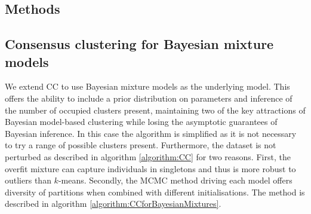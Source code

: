 \documentclass{bioinfo}
\begin{document}
\begin{methods}
\section{Methods}

\subsection{Consensus clustering for Bayesian mixture models}
We extend CC to use Bayesian mixture models as the underlying model. This offers the ability to include a prior distribution on parameters and inference of the number of occupied clusters present, maintaining two of the key attractions of Bayesian model-based clustering while losing the asymptotic guarantees of Bayesian inference. In this case the algorithm is simplified as it is not necessary to try a range of possible clusters present. Furthermore, the dataset is not perturbed as described in algorithm \ref{algorithm:CC} for two reasons. First, the overfit mixture can capture individuals in singletons and thus is more robust to outliers than $k$-means. Secondly, the MCMC method driving each model offers diversity of partitions when combined with different initialisations. The method is described in algorithm \ref{algorithm:CCforBayesianMixtures}.



\end{methods}
\end{document}
